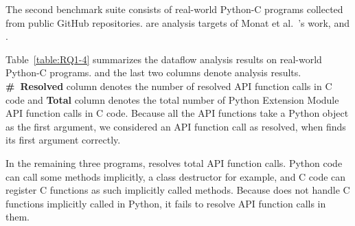 

The second benchmark suite consists of  real-world Python-C programs
collected from public GitHub repositories.  are analysis
targets of Monat et al.~\cite{sas2021}'s work, and .

Table~\ref{table:RQ1-4} summarizes the dataflow analysis results on 
real-world Python-C programs. 
and the last two columns denote analysis results.
{\bf \#~Resolved} column denotes the number of resolved API function calls in C code and
{\bf Total} column denotes the total number of Python Extension Module API function
calls in C code. 
Because all the API functions take a Python object as the first argument, we
considered an API function call as resolved, when \ours finds its first argument
correctly. 

%
In the remaining three programs, \ours resolves  total
API function calls. 
Python code can call some methods implicitly, a class destructor for example, and C
code can register C functions as such implicitly called methods.
Because \ours does not handle C functions implicitly called in Python, it
fails to resolve API function calls in them.



